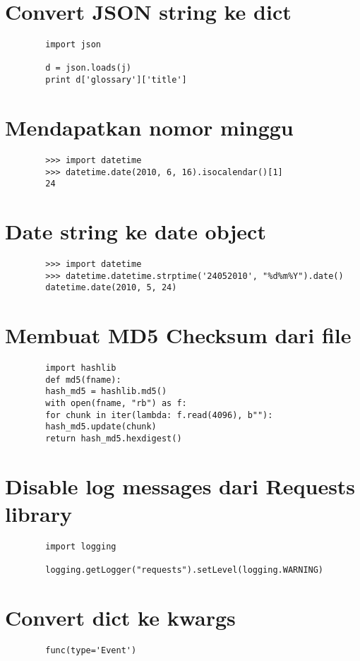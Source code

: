 \documentclass{article}
\begin{document}
	\section {Convert JSON string ke dict}
	\begin{lstlisting}
		import json
		
		d = json.loads(j)
		print d['glossary']['title']
	\end{lstlisting}
	
	\section {Mendapatkan nomor minggu}
	\begin{lstlisting}
		>>> import datetime
		>>> datetime.date(2010, 6, 16).isocalendar()[1]
		24
	\end{lstlisting}
	
	\section {Date string ke date object}
	\begin{lstlisting}
		>>> import datetime
		>>> datetime.datetime.strptime('24052010', "%d%m%Y").date()
		datetime.date(2010, 5, 24)
	\end{lstlisting}
	
	\section {Membuat MD5 Checksum dari file}
	\begin{lstlisting}
		import hashlib
		def md5(fname):
		hash_md5 = hashlib.md5()
		with open(fname, "rb") as f:
		for chunk in iter(lambda: f.read(4096), b""):
		hash_md5.update(chunk)
		return hash_md5.hexdigest()
	\end{lstlisting}
	
	\section {Disable log messages dari Requests library}
	\begin{lstlisting}
		import logging
		
		logging.getLogger("requests").setLevel(logging.WARNING)
	\end{lstlisting}
	
	\section {Convert dict ke kwargs}
	\begin{lstlisting}
		func(type='Event')
	\end{lstlisting}
	
\end{document}
